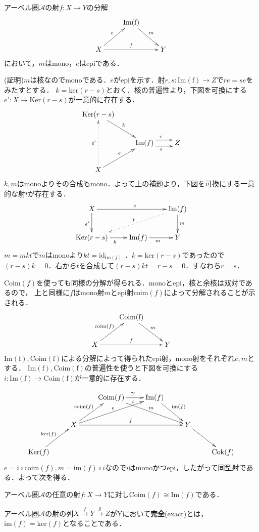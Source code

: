 \begin{thm}
アーベル圏$\mathcal{A}$の射$f : X \to Y$の分解
\[
\xymatrix{
&\mathrm{Im(f)} \ar[rd]^m  \\
X\ar[ru]^e \ar[rr]^f  && Y
}
\]
において，$m$はmono，$e$はepiである．
\end{thm}
(証明)$m$は核なのでmonoである．$e$がepiを示す．射$r,s : \mathrm{Im(f)}  \to Z$で$re = se$をみたすとする．
$k = \mathrm{ker}(r-s)$とおく．核の普遍性より，下図を可換にする$e' : X \to \mathrm{Ker}(r-s)$が一意的に存在する．
\[
\xymatrix{
\mathrm{Ker}(r-s) \ar[rd]^k \\
&\mathrm{Im}(f) \ar@<1ex>^r[r] \ar@<-1ex>_s[r] & Z \\
X \ar@{.>}[uu]^{e'} \ar[ru]^e
}
\]
$k,m$はmonoよりその合成もmono．よって上の補題より，下図を可換にする一意的な射$t$が存在する．
\[
\xymatrix{
X \ar[d]_{e'} \ar[rr]^e && \mathrm{Im}(f) \ar[d]^m  \ar@{.>}[lld]_t\\
\mathrm{Ker}(r-s) \ar[r]_{k} & \mathrm{Im}(f)  \ar[r]_m& Y
}
\]
$m = m k t$で$m$はmonoより$kt=\mathrm{id}_{\mathrm{Im}(f)}$ ．$k = \mathrm{ker}(r-s)$であったので
$(r-s)k = 0$．右から$t$を合成して$(r-s)kt=r -s = 0$．すなわち$r=s$．
\proofend

$\mathrm{Coim}(f)$を使っても同様の分解が得られる．monoとepi，核と余核は双対であるので，
上と同様に$f$はmono射$m$とepi射${\mathrm{coim}(f)}$によって分解されることが示される．
\[
\xymatrix{
&\mathrm{Coim(f)} \ar[rd]^{m}  \\
X\ar[ru]^{\mathrm{coim}(f)} \ar[rr]^f  && Y
}
\]
$\mathrm{Im(f)},\mathrm{Coim(f)} $による分解によって得られたepi射，mono射をそれぞれ$e,m$とする．
$\mathrm{Im(f)},\mathrm{Coim(f)} $の普遍性を使うと下図を可換にする$i:\mathrm{Im(f)} \to \mathrm{Coim(f)} $が一意的に存在する．

\[
\xymatrix{
&&\mathrm{Coim}(f)\ar[rrd]^m \ar[r]_i^{\cong}&\mathrm{Im}(f) \ar[rd]^{\mathrm{im}(f)} \\
&X\ar[ru]^{\mathrm{coim}(f)} \ar[rru]^e \ar[rrr]^f&&&Y \ar[rd]^{} \\
\mathrm{Ker}(f) \ar[ru]^{\mathrm{ker}(f)} &&&&& \mathrm{Cok}(f)
}
\]
$e = i \circ {\mathrm{coim}(f)}, m = {\mathrm{im}(f)} \circ i$なので$i$はmonoかつepi，したがって同型射である．よって次を得る．
\begin{thm}
アーベル圏$\mathcal{A}$の任意の射$f : X \to Y$に対し$\mathrm{Coim}(f) \cong \mathrm{Im}(f)$である．
\end{thm}
\proofend

\begin{defi}
アーベル圏$\mathcal{A}$の射の列$X \stackrel{f}{\to} Y \stackrel{g}{\to}Z$がYにおいて{\bf 完全}(exact)とは，
$\mathrm{im}(f) = \mathrm{ker}(f)$となることである． 
\end{defi} \proofend

